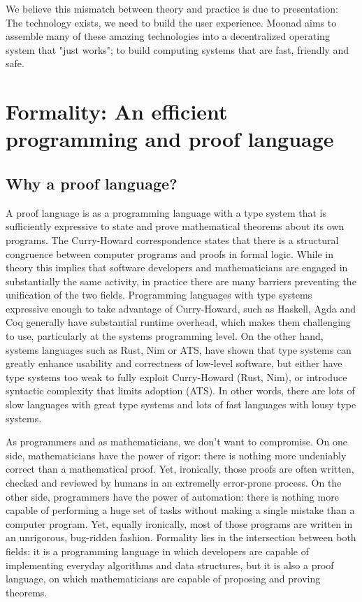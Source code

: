 \documentclass{article}
\theoremstyle{definition}
\theoremstyle{theorem}
\begin{document}
We believe this mismatch between theory and practice is due to presentation: The
technology exists, we need to build the user experience. Moonad aims to assemble
many of these amazing technologies into a decentralized operating system that
"just works"; to build computing systems that are fast, friendly and safe.

\section{Formality: An efficient programming and proof language}

\subsection{Why a proof language?}

A proof language is as a programming language with a type system that is
sufficiently expressive to state and prove mathematical theorems about its own
programs. The Curry-Howard correspondence states that there is a structural
congruence between computer programs and proofs in formal logic. While in theory
this implies that software developers and mathematicians are engaged in
substantially the same activity, in practice there are many barriers preventing
the unification of the two fields. Programming languages with type systems
expressive enough to take advantage of Curry-Howard, such as Haskell, Agda and
Coq generally have substantial runtime overhead, which makes them challenging to
use, particularly at the systems programming level. On the other hand, systems
languages such as Rust, Nim or ATS, have shown that type systems can greatly
enhance usability and correctness of low-level software, but either have type
systems too weak to fully exploit Curry-Howard (Rust, Nim), or introduce
syntactic complexity that limits adoption (ATS). In other words, there are lots
of slow languages with great type systems and lots of fast languages with lousy
type systems.

As programmers and as mathematicians, we don't want to compromise. On one side,
mathematicians have the power of rigor: there is nothing more undeniably correct
than a mathematical proof. Yet, ironically, those proofs are often written,
checked and reviewed by humans in an extremelly error-prone process. On the
other side, programmers have the power of automation: there is nothing more
capable of performing a huge set of tasks without making a single mistake than a
computer program. Yet, equally ironically, most of those programs are written in
an unrigorous, bug-ridden fashion. Formality lies in the intersection between
both fields: it is a programming language in which developers are capable of
implementing everyday algorithms and data structures, but it is also a proof
language, on which mathematicians are capable of proposing and proving theorems.
\end{document}
